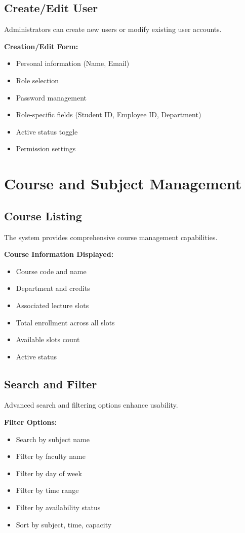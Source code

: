 \subsection{Create/Edit User}
Administrators can create new users or modify existing user accounts.

\textbf{Creation/Edit Form:}
\begin{itemize}
    \item Personal information (Name, Email)
    \item Role selection
    \item Password management
    \item Role-specific fields (Student ID, Employee ID, Department)
    \item Active status toggle
    \item Permission settings
\end{itemize}

\section{Course and Subject Management}

\subsection{Course Listing}
The system provides comprehensive course management capabilities.

\textbf{Course Information Displayed:}
\begin{itemize}
    \item Course code and name
    \item Department and credits
    \item Associated lecture slots
    \item Total enrollment across all slots
    \item Available slots count
    \item Active status
\end{itemize}

\subsection{Search and Filter}
Advanced search and filtering options enhance usability.

\textbf{Filter Options:}
\begin{itemize}
    \item Search by subject name
    \item Filter by faculty name
    \item Filter by day of week
    \item Filter by time range
    \item Filter by availability status
    \item Sort by subject, time, capacity
\end{itemize}

